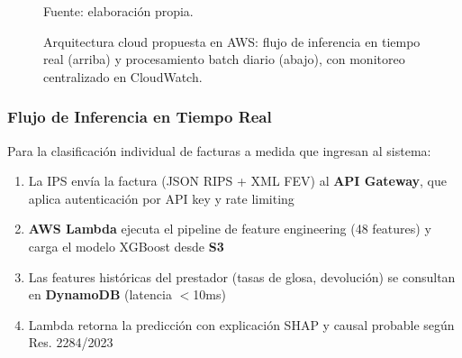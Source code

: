 \documentclass[12pt,letterpaper]{report}
\newcommand{\fuentepropia}{%
  \vspace{-0.4em}%
  {\footnotesize Fuente: elaboración propia.}%
}
\begin{document}
\begin{figure}[H]
{
}
\caption{Arquitectura cloud propuesta en AWS: flujo de inferencia en tiempo real (arriba) y procesamiento batch diario (abajo), con monitoreo centralizado en CloudWatch.}
\label{fig:arq_aws}
\fuentepropia
\end{figure}

\subsubsection{Flujo de Inferencia en Tiempo Real}

Para la clasificación individual de facturas a medida que ingresan al sistema:

\begin{enumerate}
    \item La IPS envía la factura (JSON RIPS + XML FEV) al \textbf{API Gateway}, que aplica autenticación por API key y rate limiting
    \item \textbf{AWS Lambda} ejecuta el pipeline de feature engineering (48 features) y carga el modelo XGBoost desde \textbf{S3}
    \item Las features históricas del prestador (tasas de glosa, devolución) se consultan en \textbf{DynamoDB} (latencia $<$10ms)
    \item Lambda retorna la predicción con explicación SHAP y causal probable según Res. 2284/2023
\end{enumerate}
\end{document}
